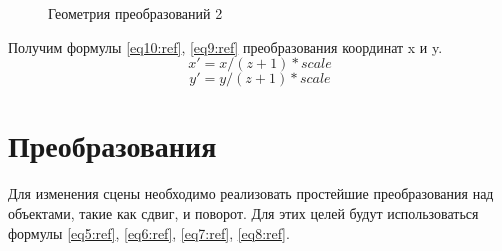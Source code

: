 \documentclass[a4paper,14pt]{report}
\begin{document}
\begin{figure}[H]
 \caption{Геометрия преобразований 2}
 \label{fig:geom2}
\end{figure}
Получим формулы \ref{eq10:ref}, \ref{eq9:ref} преобразования координат x и y.
\begin{equation}
 x' = x / (z + 1) * scale
 \label{eq10:ref}                  
 \end{equation}                                                                                              
 \begin{equation}
   y' = y / (z + 1) * scale
 \label{eq9:ref}                  
 \end{equation}                                                                                              
\section{Преобразования}
Для изменения сцены необходимо реализовать простейшие преобразования над объектами, такие как сдвиг, и поворот. Для этих целей будут использоваться формулы \ref{eq5:ref}, \ref{eq6:ref}, \ref{eq7:ref}, \ref{eq8:ref}.
\end{document}
